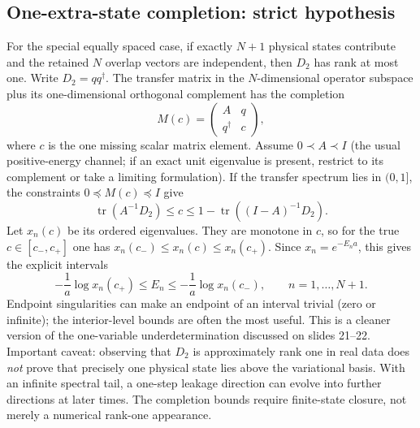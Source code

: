 \documentclass[11pt]{article}
\newcommand{\Tr}{\operatorname{tr}}
\begin{document}
\subsection*{One-extra-state completion: strict hypothesis}
For the special equally spaced case, if exactly $N+1$ physical states contribute and the retained $N$ overlap vectors are independent, then $D_2$ has rank at most one. Write $D_2=qq^\dagger$. The transfer matrix in the $N$-dimensional operator subspace plus its one-dimensional orthogonal complement has the completion
\[
M(c)=\begin{pmatrix}A&q\\q^\dagger&c\end{pmatrix},
\]
where $c$ is the one missing scalar matrix element. Assume $0\prec A\prec I$ (the usual positive-energy channel; if an exact unit eigenvalue is present, restrict to its complement or take a limiting formulation). If the transfer spectrum lies in $(0,1]$, the constraints $0\preceq M(c)\preceq I$ give
\[
\boxed{\Tr(A^{-1}D_2)\leq c\leq
1-\Tr((I-A)^{-1}D_2).}
\]
Let $x_n(c)$ be its ordered eigenvalues. They are monotone in $c$, so for the true $c\in[c_-,c_+]$ one has $x_n(c_-)\leq x_n(c)\leq x_n(c_+)$. Since $x_n=e^{-E_na}$, this gives the explicit intervals
\[
-\frac1a\log x_n(c_+)\leq E_n\leq-\frac1a\log x_n(c_-),\qquad n=1,\ldots,N+1.
\]
Endpoint singularities can make an endpoint of an interval trivial (zero or infinite); the interior-level bounds are often the most useful. This is a cleaner version of the one-variable underdetermination discussed on slides 21--22. Important caveat: observing that $D_2$ is approximately rank one in real data does \emph{not} prove that precisely one physical state lies above the variational basis. With an infinite spectral tail, a one-step leakage direction can evolve into further directions at later times. The completion bounds require finite-state closure, not merely a numerical rank-one appearance.
\end{document}
